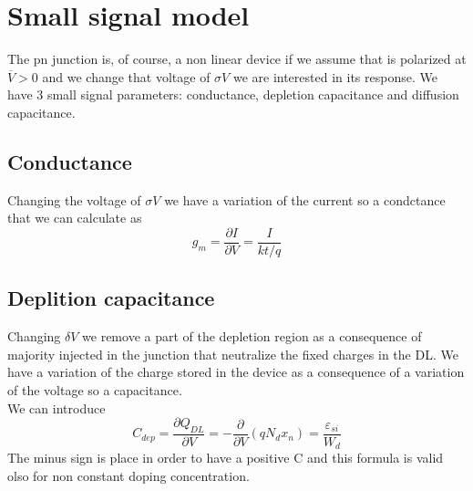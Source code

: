 \section{Small signal model}
The pn junction is, of course, a non linear device if we assume that is polarized at $\overline{V}>0$ and we change that voltage of $\sigma V$ we are interested in its response. We have 3 small signal parameters: conductance, depletion capacitance and diffusion capacitance.
\subsection{Conductance}
Changing the voltage of $\sigma V$ we have a variation of the current so a condctance that we can calculate as 
\begin{equation}
g_m=\frac{\partial I}{\partial V}=\frac{I}{kt/q}
\end{equation}
\subsection{Deplition capacitance}
Changing $\delta V$ we remove a part of the depletion region as a consequence of majority injected in the junction that neutralize the fixed charges in the DL. We have a variation of the charge stored in the device as a consequence of a variation of the voltage so a capacitance.\\
We can introduce 
\begin{equation}
C_{dep}=\frac{\partial Q_{DL}}{\partial V}=-\frac{\partial }{\partial V}(qN_dx_n)=\frac{\varepsilon_{si}}{W_d}
\end{equation}
The minus sign is place in order to have a positive C and this formula is valid olso for non constant doping concentration.\\
